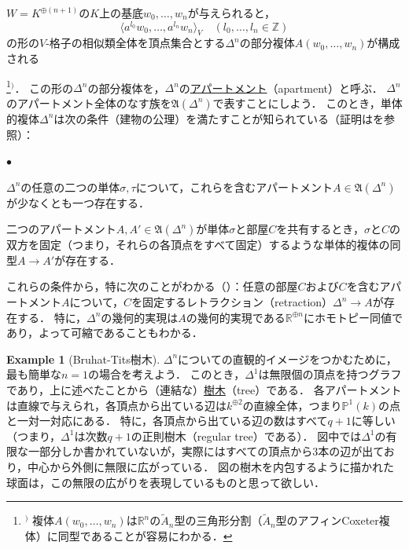 \documentclass[a4paper,12pt, dvipdfmx]{jsbook}
\def\Z{\mathbb{Z}}
\def\R{\mathbb{R}}
\def\P{\mathbb{P}}
\def\til#1{\widetilde{#1}}%
\renewenvironment{itemize}%
{%
   \begin{list}{\parbox{1zw}{$\bullet$}}%
   {%
      \setlength{\topsep}{.5zh}
      \setlength{\itemindent}{0zw}
      \setlength{\leftmargin}{3zw}%
      \setlength{\rightmargin}{0zw}%
      \setlength{\labelsep}{.5zw}%
      \setlength{\labelwidth}{3zw}%
      \setlength{\itemsep}{0.2em}%
      \setlength{\parsep}{0em}%
      \setlength{\listparindent}{0zw}%
   }
}{%
   \end{list}%
}
\theoremstyle{plain}
\theoremstyle{definition}
\newtheorem{exa}[thm]{\bfseries Example}
\newcounter{chushaku}
\def\chu#1{\addtocounter{chushaku}{1}\footnote[\value{chushaku}]{${}^)$ #1}${}^)$}
\begin{document}
$W=K^{\oplus (n+1)}$の$K$上の基底$w_0,\ldots,w_n$が与えられると，
$$
\langle a^{l_0}w_0,\ldots,a^{l_n}w_n\rangle_V\quad (l_0,\ldots,l_n\in\Z)
$$
の形の$V$-格子の相似類全体を頂点集合とする$\Delta^n$の部分複体$A(w_0,\ldots,w_n)$が構成される\chu{複体$A(w_0,\ldots,w_n)$は$\R^n$の$\til{A}_n$型の三角形分割（$\til{A}_n$型のアフィンCoxeter複体）に同型であることが容易にわかる．}．
この形の$\Delta^n$の部分複体を，$\Delta^n$の\underline{アパートメント}（apartment）と呼ぶ．
$\Delta^n$のアパートメント全体のなす族を$\mathfrak{A}(\Delta^n)$で表すことにしよう．
このとき，単体的複体$\Delta^n$は次の条件（建物の公理\cite[\S4.1]{Garrett}）を満たすことが知られている（証明は\cite[\S19.2]{Garrett}を参照）：
\begin{itemize}
\item[(a)] $\Delta^n$の任意の二つの単体$\sigma,\tau$について，これらを含むアパートメント$A\in\mathfrak{A}(\Delta^n)$が少なくとも一つ存在する．
\item[(b)] 二つのアパートメント$A,A'\in\mathfrak{A}(\Delta^n)$が単体$\sigma$と部屋$C$を共有するとき，$\sigma$と$C$の双方を固定（つまり，それらの各頂点をすべて固定）するような単体的複体の同型$A\rightarrow A'$が存在する．
\end{itemize}

これらの条件から，特に次のことがわかる（\cite[\S4.2]{Garrett}）：任意の部屋$C$および$C$を含むアパートメント$A$について，$C$を固定するレトラクション（retraction）$\Delta^n\rightarrow A$が存在する．
特に，$\Delta^n$の幾何的実現は$A$の幾何的実現である$\R^{\oplus n}$にホモトピー同値であり，よって可縮であることもわかる．

\begin{exa}[Bruhat-Tits樹木]\label{exa-BTtree}{\rm 
$\Delta^n$についての直観的イメージをつかむために，最も簡単な$n=1$の場合を考えよう．
このとき，$\Delta^1$は無限個の頂点を持つグラフであり，上に述べたことから（連結な）\underline{樹木}（tree）である．
各アパートメントは直線で与えられ，各頂点から出ている辺は$k^{\oplus 2}$の直線全体，つまり$\P^1(k)$の点と一対一対応にある．
特に，各頂点から出ている辺の数はすべて$q+1$に等しい（つまり，$\Delta^1$は次数$q+1$の正則樹木（regular tree）である）．
図中では$\Delta^1$の有限な一部分しか書かれていないが，実際にはすべての頂点から$3$本の辺が出ており，中心から外側に無限に広がっている．
図の樹木を内包するように描かれた球面は，この無限の広がりを表現しているものと思って欲しい．}
\end{exa}
\end{document}
